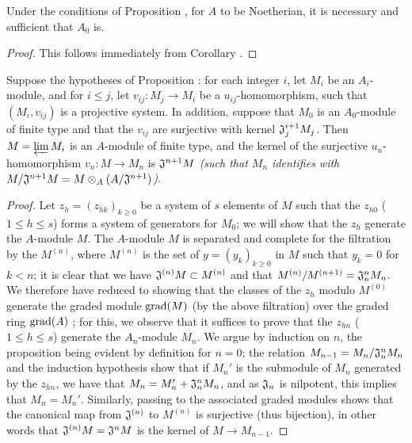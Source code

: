 \begin{cor}[7.2.8]
\label{0.7.2.8}
Under the conditions of Proposition , for $A$ to
be Noetherian, it is necessary and sufficient that $A_0$ is.
\end{cor}

\begin{proof}
\label{proof-0.7.2.8}
This follows immediately from Corollary .
\end{proof}

\begin{prop}[7.2.9]
\label{0.7.2.9}
Suppose the hypotheses of Proposition : for each integer $i$,
let $M_i$ be an $A_i$-module, and for $i\leqslant j$, let $v_{ij}:M_j\to M_i$ be a
$u_{ij}$-homomorphism, such that $(M_i,v_{ij})$ is a projective system. In addition, suppose
that $M_0$ is an $A_0$-module of finite type and that the $v_{ij}$ are surjective with kernel
$\mathfrak{J}_j^{i+1}M_j$. Then $M=\varprojlim M_i$ is an $A$-module of finite type, and the
kernel of the surjective $u_n$-homomorphism $v_n:M\to M_n$ is $\mathfrak{J}^{n+1}M$
{\em (such that $M_n$ identifies with
$M/\mathfrak{J}^{n+1}M=M\otimes_A(A/\mathfrak{J}^{n+1})$)}.
\end{prop}

\begin{proof}
\label{proof-0.7.2.9}
Let $z_h=(z_{hk})_{k\geqslant 0}$ be a system of $s$ elements of $M$ such that the $z_{h0}$
($1\leqslant h\leqslant s$) forms a system of generators for $M_0$; we will show that the
$z_h$ generate the $A$-module $M$. The $A$-module $M$ is separated and complete for the
filtration by the $M^{(n)}$, where $M^{(n)}$ is the set of $y=(y_k)_{k\geqslant 0}$ in $M$
such that $y_k=0$ for $k<n$; it is clear that we have $\mathfrak{J}^{(n)}M\subset M^{(n)}$
and that $M^{(n)}/M^{(n+1)}=\mathfrak{J}_n^n M_n$. We therefore have reduced to showing that
the classes of the $z_h$ modulo $M^{(0)}$ generate the graded module ${\mathop{\mathrm{grad}}\nolimits}(M)$ (by the
above filtration) over the graded ring ${\mathop{\mathrm{grad}}\nolimits}(A)$ \cite[p.~18--06, lemme]{I-1}; for this, we
observe that it suffices to prove that the $z_{hn}$ ($1\leqslant h\leqslant s$) generate the
$A_n$-module $M_n$. We argue by induction on $n$, the proposition being evident by definition
for $n=0$; the relation $M_{n-1}=M_n/\mathfrak{J}_n^n M_n$ and the induction hypothesis show
that if $M_n'$ is the submodule of $M_n$ generated by the $z_{hn}$, we have that
$M_n=M_n'+\mathfrak{J}_n^n M_n$, and as $\mathfrak{J}_n$ is nilpotent, this implies that
$M_n=M_n'$. Similarly, passing to the associated graded modules shows that the canonical map
from $\mathfrak{J}^{(n)}$ to $M^{(n)}$ is surjective (thus bijection), in other words that
$\mathfrak{J}^{(n)}M=\mathfrak{J}^n M$ is the kernel of $M\to M_{n-1}$.
\end{proof}

